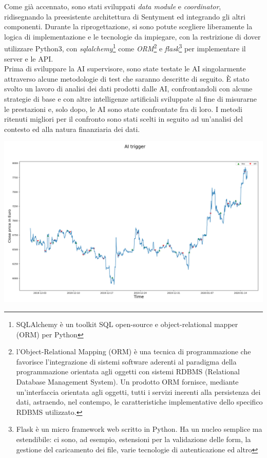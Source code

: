 \documentclass[a4paper,12pt]{report}
\begin{document}
Come già accennato, sono stati sviluppati \textit{data module} e \textit{coordinator}, ridisegnando la preesistente architettura di Sentyment ed integrando gli altri componenti. Durante la riprogettazione, si sono potute scegliere liberamente la logica di implementazione e le tecnologie da impiegare, con la restrizione di dover utilizzare Python3, con \textit{sqlalchemy}\footnote{SQLAlchemy è un toolkit SQL open-source e object-relational mapper (ORM) per Python} come \textit{ORM}\footnote{l'Object-Relational Mapping (ORM) è una tecnica di programmazione che favorisce l'integrazione di sistemi software aderenti al paradigma della programmazione orientata agli oggetti con sistemi RDBMS (Relational Database Management System). Un prodotto ORM fornisce, mediante un'interfaccia orientata agli oggetti, tutti i servizi inerenti alla persistenza dei dati, astraendo, nel contempo, le caratteristiche implementative dello specifico RDBMS utilizzato.} e \textit{flask}\footnote{Flask è un micro framework web scritto in Python. Ha un nucleo semplice ma estendibile: ci sono, ad esempio, estensioni per la validazione delle form, la gestione del caricamento dei file, varie tecnologie di autenticazione ed altro} per implementare il server e le API.\\
Prima di sviluppare la AI supervisore, sono state testate le AI singolarmente attraverso alcune metodologie di test che saranno descritte di seguito. È stato svolto un lavoro di analisi dei dati prodotti dalle AI, confrontandoli con alcune strategie di base e con altre intelligenze artificiali sviluppate al fine di misurarne le prestazioni e, solo dopo, le AI sono state confrontate fra di loro. I metodi ritenuti migliori per il confronto sono stati scelti in seguito ad un'analisi del contesto ed alla natura finanziaria dei dati.
\begin{fig}
	\begin{center}
		\includegraphics[width=\linewidth]{ai_trigger_big}
	\end{center}
	\label{Figura 11}
\end{fig}
\end{document}

